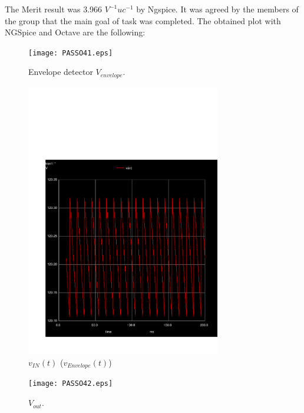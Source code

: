 The Merit result was 3.966 $V^{-1}uc^{-1}$ by Ngspice. It was agreed by the members of the group that the main goal of task was completed.
\newpage
The obtained plot with NGSpice and Octave are the following:

\begin{figure}[h] \centering
	\texttt{[image: PASSO41.eps]}
	\caption{Envelope detector $V_{envelope}$.}
\end{figure}
  	
\begin{figure}[h] \centering
	\vspace{-2cm}
	\includegraphics[height=12cm]{../sim/trans41.pdf}
	\caption{$v_{IN}(t)$ ($v_{Envelope}(t)$)}
	\vspace{-3cm}
\end{figure}

\newpage

\begin{figure}[h] \centering
	\texttt{[image: PASSO42.eps]}
	\caption{$V_{out}$.}
\end{figure}
  	
